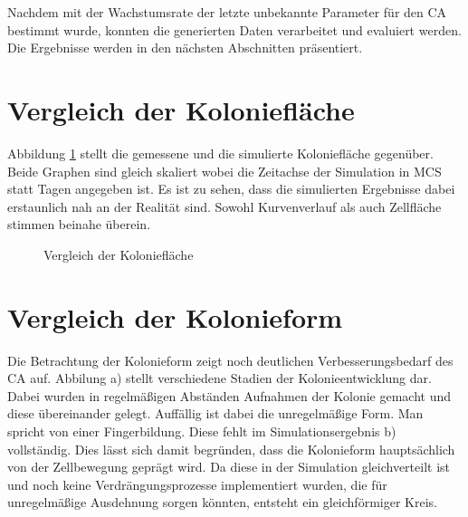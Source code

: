 \documentclass[11pt,a4paper,pointlessnumbers]{scrreprt}  %
\begin{document}
Nachdem mit der Wachstumsrate der letzte unbekannte Parameter für den CA bestimmt wurde, konnten die generierten Daten verarbeitet und evaluiert werden. Die Ergebnisse werden in den nächsten Abschnitten präsentiert.

\section{Vergleich der Koloniefläche}

Abbildung \ref{fig:Koloniegroesse} stellt die gemessene und die simulierte Koloniefläche gegenüber. Beide Graphen sind gleich skaliert wobei die Zeitachse der Simulation in MCS statt Tagen angegeben ist. Es ist zu sehen, dass die simulierten Ergebnisse dabei erstaunlich nah an der Realität sind. Sowohl Kurvenverlauf als auch Zellfläche stimmen beinahe überein. 

\begin{figure}[!ht]
	\caption{Vergleich der Koloniefläche} 
	\label{fig:Koloniegroesse}
\end{figure} 

\newpage
\section{Vergleich der Kolonieform}
Die Betrachtung der Kolonieform zeigt noch deutlichen Verbesserungsbedarf des CA auf. Abbilung a) stellt verschiedene Stadien der Kolonieentwicklung dar. Dabei wurden in regelmäßigen Abständen Aufnahmen der Kolonie gemacht und diese übereinander gelegt. Auffällig ist dabei die unregelmäßige Form. Man spricht von einer Fingerbildung. Diese fehlt im Simulationsergebnis b) vollständig. Dies lässt sich damit begründen, dass die Kolonieform hauptsächlich von der Zellbewegung geprägt wird. Da diese in der Simulation gleichverteilt ist und noch keine Verdrängungsprozesse implementiert wurden, die für unregelmäßige Ausdehnung sorgen könnten, entsteht ein gleichförmiger Kreis. 
\end{document}

